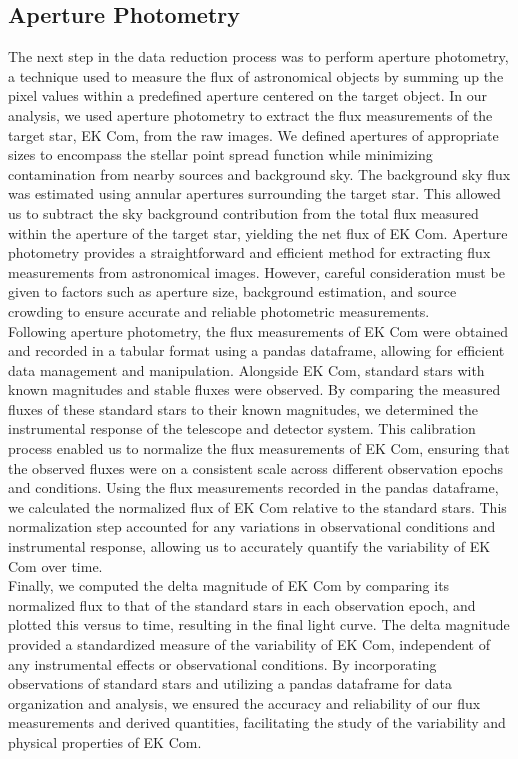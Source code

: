 \documentclass[]{aastex63}
\begin{document}
\subsection{Aperture Photometry}
The next step in the data reduction process was to perform aperture photometry, a technique used to measure the flux of astronomical objects by summing up the pixel values within a predefined aperture centered on the target object. In our analysis, we used aperture photometry to extract the flux measurements of the target star, EK Com, from the raw images. We defined apertures of appropriate sizes to encompass the stellar point spread function while minimizing contamination from nearby sources and background sky. The background sky flux was estimated using annular apertures surrounding the target star. This allowed us to subtract the sky background contribution from the total flux measured within the aperture of the target star, yielding the net flux of EK Com. Aperture photometry provides a straightforward and efficient method for extracting flux measurements from astronomical images. However, careful consideration must be given to factors such as aperture size, background estimation, and source crowding to ensure accurate and reliable photometric measurements.
\\
Following aperture photometry, the flux measurements of EK Com were obtained and recorded in a tabular format using a pandas dataframe, allowing for efficient data management and manipulation. Alongside EK Com, standard stars with known magnitudes and stable fluxes were observed. By comparing the measured fluxes of these standard stars to their known magnitudes, we determined the instrumental response of the telescope and detector system. This calibration process enabled us to normalize the flux measurements of EK Com, ensuring that the observed fluxes were on a consistent scale across different observation epochs and conditions. Using the flux measurements recorded in the pandas dataframe, we calculated the normalized flux of EK Com relative to the standard stars. This normalization step accounted for any variations in observational conditions and instrumental response, allowing us to accurately quantify the variability of EK Com over time.
\\
Finally, we computed the delta magnitude of EK Com by comparing its normalized flux to that of the standard stars in each observation epoch, and plotted this versus to time, resulting in the final light curve. The delta magnitude provided a standardized measure of the variability of EK Com, independent of any instrumental effects or observational conditions. By incorporating observations of standard stars and utilizing a pandas dataframe for data organization and analysis, we ensured the accuracy and reliability of our flux measurements and derived quantities, facilitating the study of the variability and physical properties of EK Com.
\end{document}
